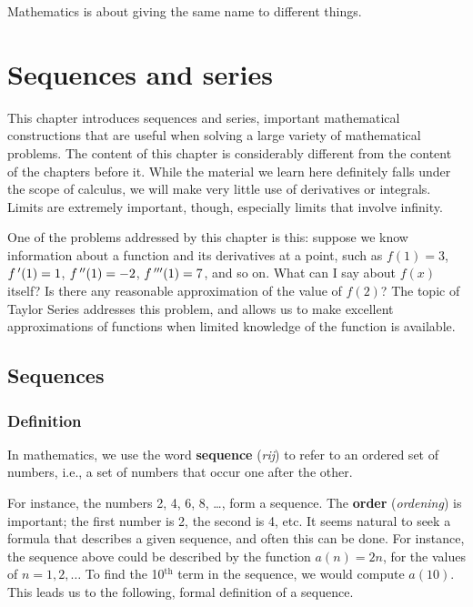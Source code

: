 \begin{savequote}[75mm]
Mathematics is about giving the same name to different things.
\end{savequote}

\chapter{Sequences and series}
\label{chap_series}
\graphicspath{{figures/Series/}}

This chapter introduces sequences and series, important mathematical constructions that are useful when solving a large variety of mathematical problems. The content of this chapter is considerably different from the content of the chapters before it. While the material we learn here definitely falls under the scope of calculus, we will make very little use of derivatives or integrals. Limits are extremely important, though, especially limits that involve infinity. 

One of the problems addressed by this chapter is this: suppose we know information about a function and its derivatives at a point, such as  $f(1) = 3$, $f\,'(1) = 1$, $f\,''(1) = -2$, $f\,'''(1) = 7$, and so on. What can I say about $f(x)$ itself? Is there any reasonable approximation of the value of $f(2)$? The topic of Taylor Series addresses this problem, and allows us to make excellent approximations of functions when limited knowledge of the function is available.

\section{Sequences}\label{sec:sequences}
\subsection{Definition}
In mathematics, we use the word \textbf{sequence} (\textit{rij})  to refer to an ordered set of numbers, i.e., a set of numbers that occur one after the other.

For instance, the numbers 2, 4, 6, 8, \ldots, form a sequence. The \textbf{order} (\textit{ordening}) is important; the first number is 2, the second is 4, etc. It seems natural to seek a formula that describes a given sequence, and often this can be done. For instance, the sequence above could be described by the function $a(n) = 2n$, for the values of $n = 1, 2, \ldots$ To find the 10$^\text{th}$ term in the sequence, we would compute $a(10)$. This leads us to the following, formal definition of a sequence.

